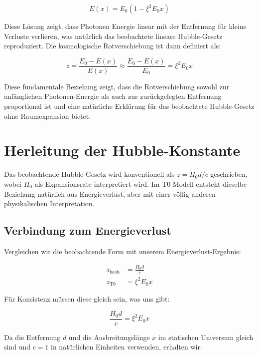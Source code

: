 \documentclass[12pt,a4paper]{article}
\begin{document}
	\begin{equation}
		E(x) = E_0 \left(1 - \xi^2 E_0 x\right)
	\end{equation}
	
	Diese Lösung zeigt, dass Photonen Energie linear mit der Entfernung für kleine Verluste verlieren, was natürlich das beobachtete lineare Hubble-Gesetz reproduziert. Die kosmologische Rotverschiebung ist dann definiert als:
	
	\begin{equation}
		z = \frac{E_0 - E(x)}{E(x)} \approx \frac{E_0 - E(x)}{E_0} = \xi^2 E_0 x
	\end{equation}
	
	Diese fundamentale Beziehung zeigt, dass die Rotverschiebung sowohl zur anfänglichen Photonen-Energie als auch zur zurückgelegten Entfernung proportional ist und eine natürliche Erklärung für das beobachtete Hubble-Gesetz ohne Raumexpansion bietet.
	
	\section{Herleitung der Hubble-Konstante}
	
	Das beobachtende Hubble-Gesetz wird konventionell als $z = H_0 d/c$ geschrieben, wobei $H_0$ als Expansionsrate interpretiert wird. Im T0-Modell entsteht dieselbe Beziehung natürlich aus Energieverlust, aber mit einer völlig anderen physikalischen Interpretation.
	
	\subsection{Verbindung zum Energieverlust}
	
	Vergleichen wir die beobachtende Form mit unserem Energieverlust-Ergebnis:
	
	\begin{align}
		z_{\text{beob}} &= \frac{H_0 d}{c} \\
		z_{\text{T0}} &= \xi^2 E_0 x
	\end{align}
	
	Für Konsistenz müssen diese gleich sein, was uns gibt:
	
	\begin{equation}
		\frac{H_0 d}{c} = \xi^2 E_0 x
	\end{equation}
	
	Da die Entfernung $d$ und die Ausbreitungslänge $x$ im statischen Universum gleich sind und $c = 1$ in natürlichen Einheiten verwenden, erhalten wir:
	
\end{document}
